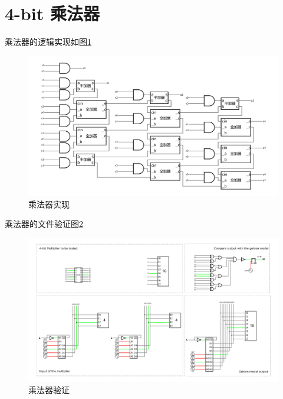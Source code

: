 \documentclass{article}
\newcommand{\np}{\noindent\par}
\begin{document}
\section{4-bit 乘法器}

乘法器的逻辑实现如图\ref{fig:chengfaqishixian} \np

\begin{figure}[htbp]
    \centering
    \includegraphics[width=1\textwidth]{4-bit乘法器.pdf}
    \caption{乘法器实现}
    \label{fig:chengfaqishixian}
\end{figure}

乘法器的文件验证图\ref{fig:chengfaqiyanzheng}

\begin{figure}[htbp]
    \centering
    \includegraphics[width=1\textwidth]{乘法器验证.pdf}
    \caption{乘法器验证}
    \label{fig:chengfaqiyanzheng}
\end{figure}
\end{document}

